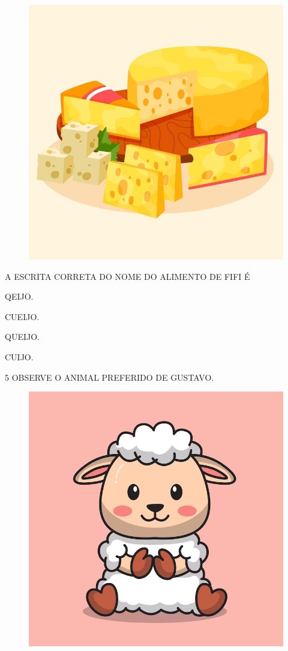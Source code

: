 \begin{figure}[H]
\centering
\includegraphics[width=.8\textwidth]{./media/image213.png}
\end{figure}

A ESCRITA CORRETA DO NOME DO ALIMENTO DE FIFI É

\begin{escolha}

\item QEIJO.

\item CUEIJO.

\item QUEIJO.

\item CUIJO.

\end{escolha}

\num{5} OBSERVE O ANIMAL PREFERIDO DE GUSTAVO.

\begin{figure}[H]
\centering
\includegraphics[width=.7\textwidth]{./media/image214.png}
\end{figure}

